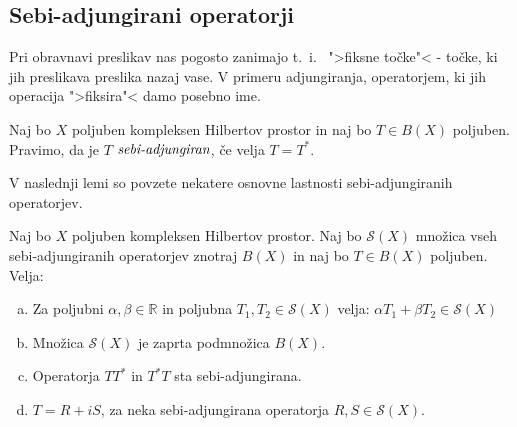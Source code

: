 \documentclass[mat2]{matdelo}
\newcommand{\R}{\mathbb{R}}
\newcommand{\pojem}[1]{\ensuremath{\emph{#1}}}
\begin{document}
			\subsection{Sebi-adjungirani operatorji}
			Pri obravnavi preslikav nas pogosto zanimajo t.~i.~ ">fiksne točke"< - točke, ki jih preslikava preslika nazaj vase. V primeru adjungiranja, operatorjem, ki jih operacija ">fiksira"< damo posebno ime.
			\begin{definicija}
				\label{def:sebiadjop}
				Naj bo $X$ poljuben kompleksen Hilbertov prostor in naj bo $T\in B(X)$ poljuben. Pravimo, da je $T$ \pojem{sebi-adjungiran}, če velja $T = T^*$.
			\end{definicija}
			V naslednji lemi so povzete nekatere osnovne lastnosti sebi-adjungiranih operatorjev.
			\begin{lema}
				\label{lem:sebiadjlast}
				Naj bo $X$ poljuben kompleksen Hilbertov prostor. Naj bo $\mathcal{S}(X)$ množica vseh sebi-adjungiranih operatorjev znotraj $B(X)$ in naj bo $T\in B(X)$ poljuben. Velja:
				\begin{enumerate}[a)]
					\item Za poljubni $\alpha, \beta \in \R$ in poljubna $T_1, T_2 \in \mathcal{S}(X)$ velja: $\alpha T_1 + \beta T_2 \in \mathcal{S}(X)$
					\item Množica $\mathcal{S}(X)$ je zaprta podmnožica $B(X)$.
					\item Operatorja $TT^*$ in $T^*T$ sta sebi-adjungirana.
					\item $T = R + iS$, za neka sebi-adjungirana operatorja $R, S \in \mathcal{S}(X)$.
				\end{enumerate}
			\end{lema}
\end{document}
